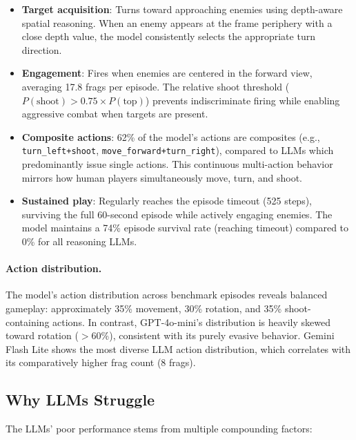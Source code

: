 \documentclass[11pt,a4paper]{article}
\begin{document}
\begin{itemize}
    \item \textbf{Target acquisition}: Turns toward approaching enemies using depth-aware spatial reasoning. When an enemy appears at the frame periphery with a close depth value, the model consistently selects the appropriate turn direction.
    \item \textbf{Engagement}: Fires when enemies are centered in the forward view, averaging 17.8 frags per episode. The relative shoot threshold ($P(\text{shoot}) > 0.75 \times P(\text{top})$) prevents indiscriminate firing while enabling aggressive combat when targets are present.
    \item \textbf{Composite actions}: 62\% of the model's actions are composites (e.g., \texttt{turn\_left+shoot}, \texttt{move\_forward+turn\_right}), compared to LLMs which predominantly issue single actions. This continuous multi-action behavior mirrors how human players simultaneously move, turn, and shoot.
    \item \textbf{Sustained play}: Regularly reaches the episode timeout (525 steps), surviving the full 60-second episode while actively engaging enemies. The model maintains a 74\% episode survival rate (reaching timeout) compared to 0\% for all reasoning LLMs.
\end{itemize}

\paragraph{Action distribution.} The model's action distribution across benchmark episodes reveals balanced gameplay: approximately 35\% movement, 30\% rotation, and 35\% shoot-containing actions. In contrast, GPT-4o-mini's distribution is heavily skewed toward rotation ($>$60\%), consistent with its purely evasive behavior. Gemini Flash Lite shows the most diverse LLM action distribution, which correlates with its comparatively higher frag count (8 frags).

\subsection{Why LLMs Struggle}

The LLMs' poor performance stems from multiple compounding factors:
\end{document}
